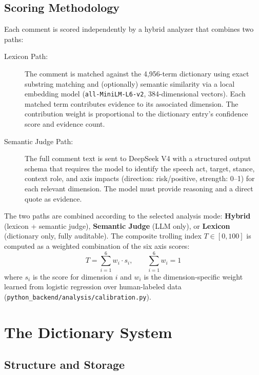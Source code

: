 \documentclass[11pt,a4paper]{article}
\begin{document}
\subsection{Scoring Methodology}

Each comment is scored independently by a hybrid analyzer that combines two paths:

\begin{description}
  \item[Lexicon Path:] The comment is matched against the 4,956-term dictionary using
    exact substring matching and (optionally) semantic similarity via a local embedding
    model (\texttt{all-MiniLM-L6-v2}, 384-dimensional vectors). Each matched term
    contributes evidence to its associated dimension. The contribution weight is
    proportional to the dictionary entry's confidence score and evidence count.
  \item[Semantic Judge Path:] The full comment text is sent to DeepSeek V4 with a
    structured output schema that requires the model to identify the speech act,
    target, stance, context role, and axis impacts (direction: risk/positive, strength:
    0--1) for each relevant dimension. The model must provide reasoning and a direct
    quote as evidence.
\end{description}

The two paths are combined according to the selected analysis mode:
\textbf{Hybrid} (lexicon + semantic judge), \textbf{Semantic Judge} (LLM only), or
\textbf{Lexicon} (dictionary only, fully auditable). The composite trolling index
$T \in [0,100]$ is computed as a weighted combination of the six axis scores:
\begin{equation}
  T = \sum_{i=1}^{6} w_i \cdot s_i,\qquad \sum_{i=1}^{6} w_i = 1
  \label{eq:trolling_index}
\end{equation}
where $s_i$ is the score for dimension $i$ and $w_i$ is the dimension-specific weight
learned from logistic regression over human-labeled data
(\texttt{python\_backend/analysis/calibration.py}).


\section{The Dictionary System}

\subsection{Structure and Storage}
\end{document}
